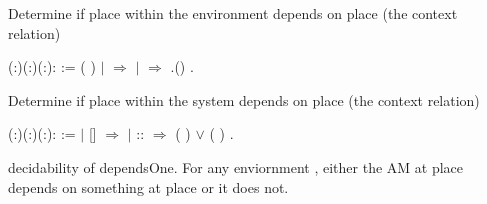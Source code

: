 \documentclass[12pt]{report}
\begin{document}
Determine if place  within the environment   
    depends on place  (the context relation) 
\begin{coqdoccode}
\coqdocnoindent
{}  (:)(:)(:): :=\coqdoceol
\coqdocnoindent
{} ( ) \coqdoceol
\coqdocnoindent
\ensuremath{|}  \ensuremath{\Rightarrow} \coqdoceol
\coqdocnoindent
\ensuremath{|}   \ensuremath{\Rightarrow}   .()\coqdoceol
\coqdocnoindent
{}.\coqdoceol
\coqdocemptyline
\end{coqdoccode}
Determine if place  within the system  depends on place  (the context relation) 
\begin{coqdoccode}
\coqdocemptyline
\coqdocnoindent
{}  (:)(:)(:): :=\coqdoceol
\coqdocnoindent
{}  \coqdoceol
\coqdocnoindent
\ensuremath{|} [] \ensuremath{\Rightarrow} \coqdoceol
\coqdocnoindent
\ensuremath{|}  ::  \ensuremath{\Rightarrow} (   ) \ensuremath{\lor} (   )\coqdoceol
\coqdocnoindent
{}.\coqdoceol
\coqdocemptyline
\end{coqdoccode}
decidability of dependsOne. For any enviornment , either the AM at place
    depends on something at place  or it does not. 
\end{document}
